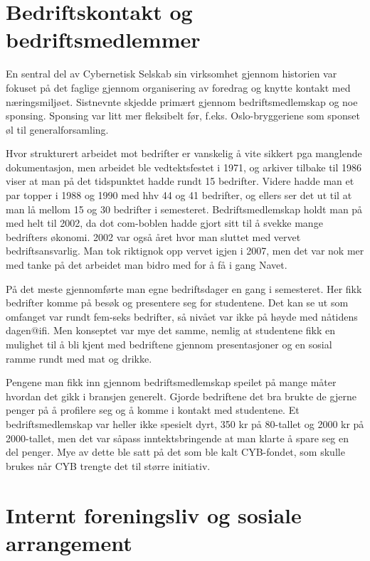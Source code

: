 \section{Bedriftskontakt og bedriftsmedlemmer}

En sentral del av Cybernetisk Selskab sin virksomhet gjennom historien var fokuset på det faglige gjennom organisering av foredrag og knytte kontakt med næringsmiljøet. Sistnevnte skjedde primært gjennom bedriftsmedlemskap og noe sponsing. Sponsing var litt mer fleksibelt før, f.eks. Oslo-bryggeriene som sponset øl til generalforsamling.

Hvor strukturert arbeidet mot bedrifter er vanskelig å vite sikkert pga manglende dokumentasjon, men arbeidet ble vedtektsfestet i 1971, og arkiver tilbake til 1986 viser at man på det tidspunktet hadde rundt 15 bedrifter. Videre hadde man et par topper i 1988 og 1990 med hhv 44 og 41 bedrifter, og ellers ser det ut til at man lå mellom 15 og 30 bedrifter i semesteret. Bedriftsmedlemskap holdt man på med helt til 2002, da dot com-boblen hadde gjort sitt til å svekke mange bedrifters økonomi. 2002 var også året hvor man sluttet med vervet bedriftsansvarlig. Man tok riktignok opp vervet igjen i 2007, men det var nok mer med tanke på det arbeidet man bidro med for å få i gang Navet.

På det meste gjennomførte man egne bedriftsdager en gang i semesteret. Her fikk bedrifter komme på besøk og presentere seg for studentene. Det kan se ut som omfanget var rundt fem-seks bedrifter, så nivået var ikke på høyde med nåtidens dagen@ifi. Men konseptet var mye det samme, nemlig at studentene fikk en mulighet til å bli kjent med bedriftene gjennom presentasjoner og en sosial ramme rundt med mat og drikke.

Pengene man fikk inn gjennom bedriftsmedlemskap speilet på mange måter hvordan det gikk i bransjen generelt. Gjorde bedriftene det bra brukte de gjerne penger på å profilere seg og å komme i kontakt med studentene. Et bedriftsmedlemskap var heller ikke spesielt dyrt, 350 kr på 80-tallet og 2000 kr på 2000-tallet, men det var såpass inntektsbringende at man klarte å spare seg en del penger. Mye av dette ble satt på det som ble kalt CYB-fondet, som skulle brukes når CYB trengte det til større initiativ.

\section{Internt foreningsliv og sosiale arrangement}

